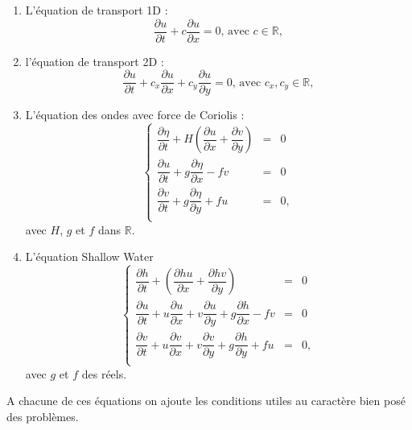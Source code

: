 \begin{enumerate}
\item L'équation de transport 1D :
\begin{equation}
\dfrac{\partial u}{\partial t} + c \dfrac{\partial u}{\partial x} = 0 \text{, avec } c \in \mathbb{R},
\end{equation} 

\item l'équation de transport 2D :
\begin{equation}
\dfrac{\partial u}{\partial t} + c_x \dfrac{\partial u}{\partial x} + c_y \dfrac{\partial u}{\partial y} = 0 \text{, avec } c_x, c_y \in \mathbb{R},
\end{equation} 

\item L'équation des ondes avec force de Coriolis :
\begin{equation}
\left\lbrace
\begin{array}{rcl}
\dfrac{\partial \eta}{\partial t} + H \left( \dfrac{\partial u}{\partial x} + \dfrac{\partial v}{\partial y} \right) & = & 0 \\
\dfrac{\partial u}{\partial t} + g \dfrac{\partial \eta}{\partial x} - f v & = & 0 \\
\dfrac{\partial v}{\partial t} + g \dfrac{\partial \eta}{\partial y} + f u & = & 0, \\
\end{array}
\right.
\end{equation}
avec $H$, $g$ et $f$ dans $\mathbb{R}$.
\item L'équation Shallow Water
\begin{equation}
\left\lbrace
\begin{array}{rcl}
\dfrac{\partial h}{\partial t} + \left( \dfrac{\partial hu}{\partial x} + \dfrac{\partial hv}{\partial y} \right) & = & 0 \\
\dfrac{\partial u}{\partial t} + u \dfrac{\partial u}{\partial x} + v\dfrac{\partial u}{\partial y} + g \dfrac{\partial h}{\partial x} - f v & = & 0 \\
\dfrac{\partial v}{\partial t} + u \dfrac{\partial v}{\partial x} + v\dfrac{\partial v}{\partial y} + g \dfrac{\partial h}{\partial y} + f u & = & 0, \\
\end{array}
\right.
\end{equation}
avec $g$ et $f$ des réels.
\end{enumerate}
A chacune de ces équations on ajoute les conditions utiles au caractère bien posé des problèmes.


